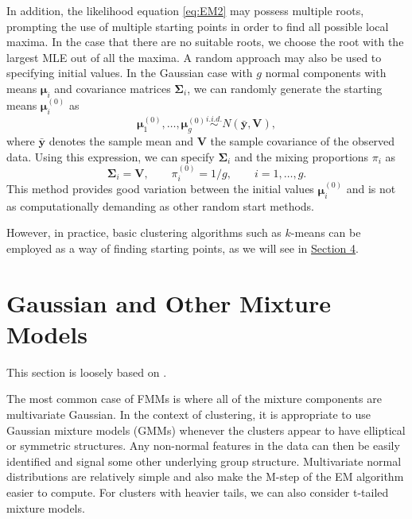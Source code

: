 \documentclass{article}\usepackage[]{graphicx}\usepackage[]{xcolor}
\theoremstyle{plain}
\theoremstyle{definition}
\theoremstyle{remark}
\newcommand{\boldy}{\mathbf{y}}
\newcommand{\boldmu}{\boldsymbol{\mu}}
\newcommand{\boldSigma}{\boldsymbol{\Sigma}}
\begin{document}
In addition, the likelihood equation \eqref{eq:EM2} may possess multiple roots, prompting the use of multiple starting points in order to find all possible local maxima. In the case that there are no suitable roots, we choose the root with the largest MLE out of all the maxima.
\newpage
A random approach may also be used to specifying initial values. In the Gaussian case with $g$ normal components with means $\boldmu_i$ and covariance matrices $\boldSigma_i$, we can randomly generate the starting means $\boldmu_i^{(0)}$ as
\begin{equation*}
  \boldmu_1^{(0)}, \dots, \boldmu_g^{(0)} \stackrel{i.i.d.}{\sim} N(\bar{\boldy}, \boldsymbol{V}),
\end{equation*}
where $\bar{\boldy}$ denotes the sample mean and $\boldsymbol{V}$ the sample covariance of the observed data. Using this expression, we can specify $\boldSigma_i$ and the mixing proportions $\pi_i$ as
\begin{equation*}
  \boldSigma_i = \boldsymbol{V}, \qquad \pi_i^{(0)} = 1/g, \qquad i = 1, \dots, g.
\end{equation*}
This method provides good variation between the initial values $\boldmu_i^{(0)}$ and is not as computationally demanding as other random start methods.

However, in practice, basic clustering algorithms such as $k$-means can be employed as a way of finding starting points, as we will see in \hyperref[sec:Iris]{Section 4}.


\newpage


\section{Gaussian and Other Mixture Models}\label{sec:GMM}

This section is loosely based on \cite[Sections 3.2 and 3.3]{FMMs_Book}.

The most common case of FMMs is where all of the mixture components are multivariate Gaussian. In the context of clustering, it is appropriate to use Gaussian mixture models (GMMs) whenever the clusters appear to have elliptical or symmetric structures. Any non-normal features in the data can then be easily identified and signal some other underlying group structure. Multivariate normal distributions are relatively simple and also make the M-step of the EM algorithm easier to compute. For clusters with heavier tails, we can also consider t-tailed mixture models.
\end{document}
